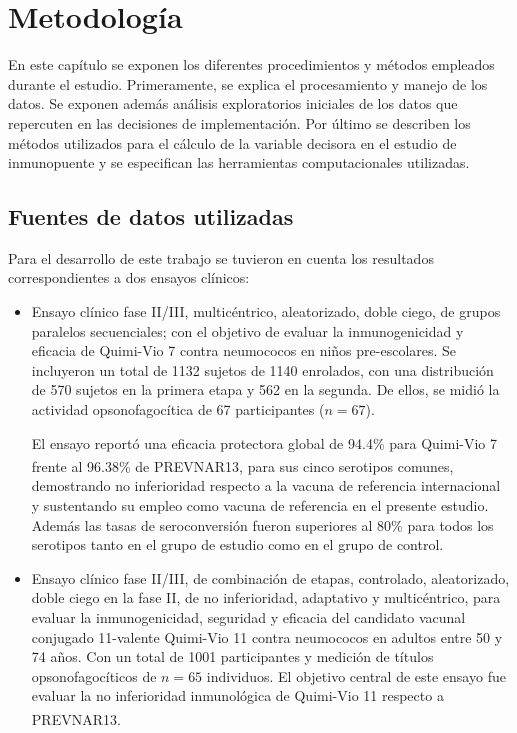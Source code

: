\chapter{Metodología}\label{chapter:proposal}
En este capítulo se exponen los diferentes procedimientos y métodos empleados durante el estudio. Primeramente, se explica el procesamiento y manejo de los datos. Se exponen además análisis exploratorios iniciales de los datos que repercuten en las decisiones de implementación. Por último se describen los métodos utilizados para el cálculo de la variable decisora en el estudio de inmunopuente y se especifican las herramientas computacionales utilizadas.

\section {Fuentes de datos utilizadas}

Para el desarrollo de este trabajo se tuvieron en cuenta los resultados correspondientes a dos ensayos clínicos:
\begin{itemize}
	\item Ensayo clínico fase II/III, multicéntrico, aleatorizado, doble ciego, de grupos paralelos secuenciales; con el objetivo de evaluar la inmunogenicidad y eficacia de Quimi-Vio 7 contra neumococos en niños pre-escolares. Se incluyeron un total de 1132 sujetos de 1140 enrolados, con una distribución de 570 sujetos en  la  primera etapa y 562 en la segunda. De ellos, se  midió la actividad opsonofagocítica de 67 participantes ($n = 67$).
	
	El ensayo reportó una eficacia protectora global de 94.4\% para Quimi-Vio 7 frente al 96.38\% de PREVNAR13\textsuperscript{\textregistered}, para sus cinco serotipos comunes, demostrando no inferioridad respecto a la vacuna de referencia internacional y sustentando  su empleo como vacuna de referencia en el presente estudio. Además las tasas de seroconversión fueron superiores al 80\% para todos los serotipos tanto en el grupo de estudio como en el grupo de control. 
	
	
	\item Ensayo clínico fase II/III, de combinación de etapas, controlado, aleatorizado, doble ciego en la fase II,  de no inferioridad, adaptativo y multicéntrico, para evaluar la inmunogenicidad, seguridad y eficacia del candidato vacunal conjugado 11-valente Quimi-Vio 11 contra neumococos en adultos entre 50 y 74 años. Con un total de 1001 participantes y medición de títulos opsonofagocíticos de $n = 65$ individuos. El objetivo central de este ensayo fue evaluar la no inferioridad inmunológica de Quimi-Vio 11 respecto a  PREVNAR13\textsuperscript{\textregistered}.
\end{itemize}

